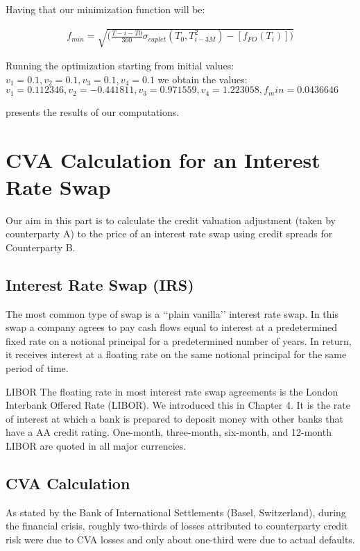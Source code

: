 \documentclass[11pt]{article}
\numberwithin{equation}{subsection}
\begin{document}
Having that our minimization function will be:

\begin{eqnarray*}
	f_{min} = \sqrt{\big(\frac{T-i-T0}{360} \sigma_{caplet}(T_0, T_{i-3M}^2) - [f_{FO}(T_i)]\big)}
\end{eqnarray*}


Running the optimization starting from initial values: \(v_1=0.1, v_2=0.1, v_3=0.1, v_4=0.1\)  we obtain the values:
\(v_1=0.112346, v_2=-0.441811, v_3=0.971559, v_4=1.223058, f_min=0.0436646\) 

presents the results of our computations.

\section{CVA Calculation for an Interest Rate Swap}
Our aim in this part is to calculate the credit valuation adjustment (taken by counterparty A) to the price of an interest rate swap using credit spreads for Counterparty B.\\

\subsection{Interest Rate Swap (IRS)}
The most common type of swap is a ‘‘plain vanilla’’ interest rate swap. In this swap a
company agrees to pay cash flows equal to interest at a predetermined fixed rate on a
notional principal for a predetermined number of years. In return, it receives interest at
a floating rate on the same notional principal for the same period of time.

LIBOR
The floating rate in most interest rate swap agreements is the London Interbank Offered
Rate (LIBOR). We introduced this in Chapter 4. It is the rate of interest at which a bank
is prepared to deposit money with other banks that have a AA credit rating. One-month,
three-month, six-month, and 12-month LIBOR are quoted in all major currencies.

\subsection{CVA Calculation}
As stated by the Bank of International Settlements (Basel, Switzerland), during the financial crisis, roughly two-thirds of losses attributed to counterparty credit risk were due to CVA losses and only about one-third were due to actual defaults.
\end{document}
